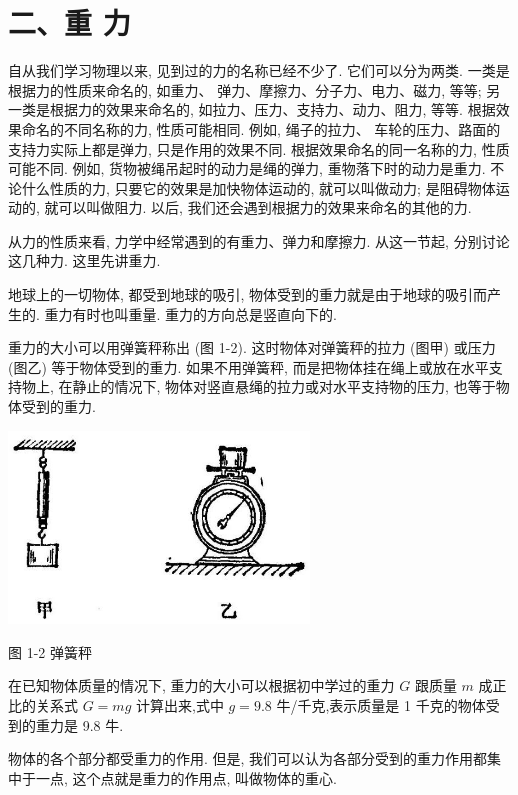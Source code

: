 \documentclass[10pt]{article}
\begin{document}
\section*{二、重 力}

自从我们学习物理以来, 见到过的力的名称已经不少了. 它们可以分为两类. 一类是根据力的性质来命名的, 如重力、 弹力、摩擦力、分子力、电力、磁力, 等等; 另一类是根据力的效果来命名的, 如拉力、压力、支持力、动力、阻力, 等等. 根据效果命名的不同名称的力, 性质可能相同. 例如, 绳子的拉力、 车轮的压力、路面的支持力实际上都是弹力, 只是作用的效果不同. 根据效果命名的同一名称的力, 性质可能不同. 例如, 货物被绳吊起时的动力是绳的弹力, 重物落下时的动力是重力. 不论什么性质的力, 只要它的效果是加快物体运动的, 就可以叫做动力; 是阻碍物体运动的, 就可以叫做阻力. 以后, 我们还会遇到根据力的效果来命名的其他的力.

从力的性质来看, 力学中经常遇到的有重力、弹力和摩擦力. 从这一节起, 分别讨论这几种力. 这里先讲重力.

地球上的一切物体, 都受到地球的吸引, 物体受到的重力就是由于地球的吸引而产生的. 重力有时也叫重量. 重力的方向总是竖直向下的.

重力的大小可以用弹簧秤称出 (图 1-2). 这时物体对弹簧秤的拉力 (图甲) 或压力 (图乙) 等于物体受到的重力. 如果不用弹簧秤, 而是把物体挂在绳上或放在水平支持物上, 在静止的情况下, 物体对竖直悬绳的拉力或对水平支持物的压力, 也等于物体受到的重力.

\begin{center}
\includegraphics[max width=0.6\textwidth]{images/01912d55-147c-70aa-b0e0-1782a122f948_18_560108.jpg}
\end{center}

图 1-2 弹簧秤

在已知物体质量的情况下, 重力的大小可以根据初中学过的重力 \(G\) 跟质量 \(m\) 成正比的关系式 \(G = {mg}\) 计算出来,式中 \(g = {9.8}\) 牛/千克,表示质量是 1 千克的物体受到的重力是 9.8 牛.

物体的各个部分都受重力的作用. 但是, 我们可以认为各部分受到的重力作用都集中于一点, 这个点就是重力的作用点, 叫做物体的重心.
\end{document}
